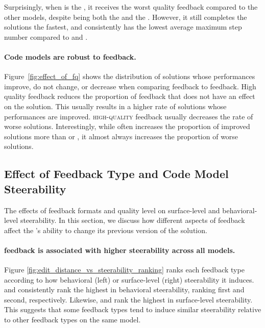 Surprisingly, when \sonnet{} is the \cm{}, it receives the worst quality feedback compared to the other models, despite being both the \cm{} and the \user{}. 
However, it still completes the solutions the fastest, and consistently has the lowest average maximum step number compared to \gpt{} and \sonnet. 


\paragraph{Code models are robust to \lqf{} feedback.}
Figure~\ref{fig:effect_of_fq} shows the distribution of solutions whose performances improve, do not change, or decrease when comparing \hqf{} feedback to \lqf{} feedback. 
High quality feedback reduces the proportion of feedback that does not have an effect on the solution.
This usually results in a higher rate of solutions whose performances are improved.
\textsc{high-quality} \sent{} feedback usually decreases the rate of worse solutions.
Interestingly, while \cf{} often increases the proportion of improved solutions more than \para{} or \sent, it almost always increases the proportion of worse solutions.









\subsection{Effect of Feedback Type and Code Model Steerability}

The effects of feedback formats and quality level on surface-level and behavioral-level steerability.
In this section, we discuss how different aspects of feedback affect the \cm 's ability to change its previous version of the solution.

\paragraph{\para{} feedback is associated with higher steerability across all models.} 
Figure \ref{fig:edit_distance_vs_steerability_ranking} ranks each feedback type according to how behavioral (left) or surface-level (right) steerability it induces.
\para{} and \cf{} consistently rank the highest in behavioral steerability, ranking first and second, respectively. 
Likewise, \para{} and \sent{} rank the highest in surface-level steerability. 
This suggests that some feedback types tend to induce similar steerability relative to other feedback types on the same model.



